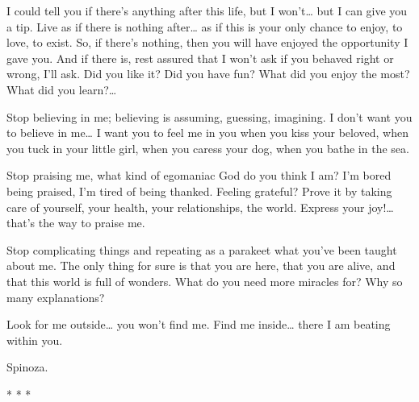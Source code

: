 I could tell you if there's anything after this life, but I won't… but I can give you a tip. Live as if there is nothing after… as if this is your only chance to enjoy, to love, to exist. So, if there's nothing, then you will have enjoyed the opportunity I gave you. And if there is, rest assured that I won't ask if you behaved right or wrong, I'll ask. Did you like it? Did you have fun? What did you enjoy the most? What did you learn?…

Stop believing in me; believing is assuming, guessing, imagining. I don't want you to believe in me… I want you to feel me in you when you kiss your beloved, when you tuck in your little girl, when you caress your dog, when you bathe in the sea.

Stop praising me, what kind of egomaniac God do you think I am? I'm bored being praised, I'm tired of being thanked. Feeling grateful? Prove it by taking care of yourself, your health, your relationships, the world. Express your joy!… that's the way to praise me.

Stop complicating things and repeating as a parakeet what you've been taught about me. The only thing for sure is that you are here, that you are alive, and that this world is full of wonders. What do you need more miracles for? Why so many explanations?

Look for me outside… you won't find me. Find me inside… there I am beating within you.

Spinoza.




\begin{center}* * *\end{center}

